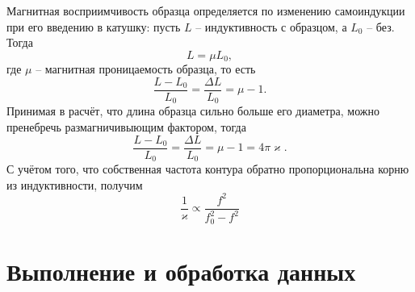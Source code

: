 \documentclass[a4paper,12pt]{article}
\theoremstyle{definition}
\begin{document}
Магнитная восприимчивость образца определяется по изменению самоиндукции при его введению в катушку: пусть $L$ -- индуктивность с образцом, а $L_0$ -- без. Тогда
\[
L = \mu L_0,
\]
где $\mu$ -- магнитная проницаемость образца, то есть
\[
\dfrac{L - L_0}{L_0} = \dfrac{\Delta L}{L_0} = \mu - 1.
\]
Принимая в расчёт, что длина образца сильно больше его диаметра, можно пренебречь размагничивыющим фактором, тогда
\[
\dfrac{L - L_0}{L_0} = \dfrac{\Delta L}{L_0} = \mu - 1 = 4\pi \varkappa.
\]
С учётом того, что собственная частота контура обратно пропорциональна корню из индуктивности, получим
\begin{equation}\label{5}
\boxed{\dfrac{1}{\varkappa} \propto \dfrac{f^2}{f_0^2 - f^2}}
\end{equation}

\newpage
\section*{Выполнение и обработка данных}
\end{document}
